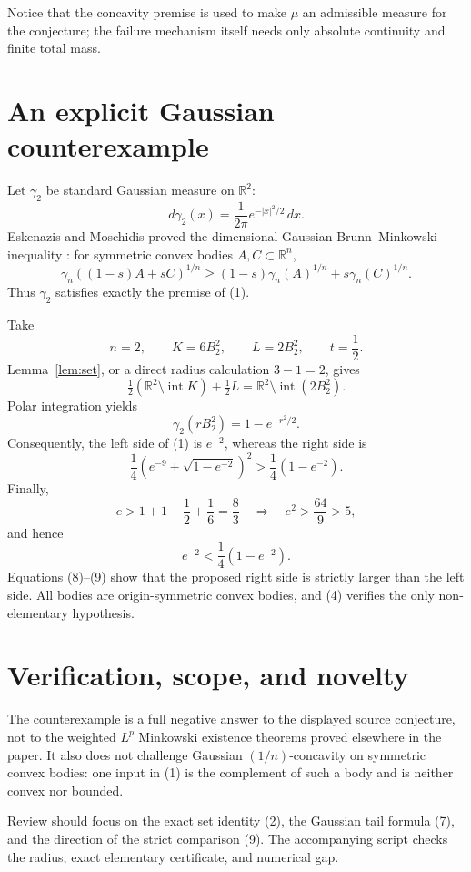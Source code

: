 \documentclass[11pt]{article}
\newcommand{\R}{\mathbb R}
\newcommand{\gauss}{\gamma}
\begin{document}
Notice that the concavity premise is used to make \(\mu\) an admissible
measure for the conjecture; the failure mechanism itself needs only
absolute continuity and finite total mass.

\section{An explicit Gaussian counterexample}

Let \(\gauss_2\) be standard Gaussian measure on \(\R^2\):
\[
 d\gauss_2(x)=\frac1{2\pi}e^{-|x|^2/2}\,dx.
\]
Eskenazis and Moschidis proved the dimensional Gaussian
Brunn--Minkowski inequality \cite{EM}: for symmetric convex bodies
\(A,C\subset\R^n\),
\[
 \gauss_n((1-s)A+sC)^{1/n}
 \ge(1-s)\gauss_n(A)^{1/n}+s\gauss_n(C)^{1/n}.
 \tag{4}
\]
Thus \(\gauss_2\) satisfies exactly the premise of (1).

Take
\[
 n=2,\qquad K=6B_2^2,\qquad L=2B_2^2,\qquad t=\frac12.
 \tag{5}
\]
Lemma~\ref{lem:set}, or a direct radius calculation \(3-1=2\), gives
\[
 \tfrac12(\R^2\setminus\operatorname{int}K)+\tfrac12L
 =\R^2\setminus\operatorname{int}(2B_2^2). \tag{6}
\]
Polar integration yields
\[
 \gauss_2(rB_2^2)=1-e^{-r^2/2}. \tag{7}
\]
Consequently, the left side of (1) is \(e^{-2}\), whereas the right side is
\[
 \frac14\left(e^{-9}+\sqrt{1-e^{-2}}\right)^2
 >\frac14(1-e^{-2}). \tag{8}
\]
Finally,
\[
 e>1+1+\frac12+\frac16=\frac83
 \quad\Longrightarrow\quad e^2>\frac{64}{9}>5,
\]
and hence
\[
 e^{-2}<\frac14(1-e^{-2}). \tag{9}
\]
Equations (8)--(9) show that the proposed right side is strictly larger than
the left side.  All bodies are origin-symmetric convex bodies, and (4)
verifies the only non-elementary hypothesis.

\section{Verification, scope, and novelty}

The counterexample is a full negative answer to the displayed source
conjecture, not to the weighted \(L^p\) Minkowski existence theorems proved
elsewhere in the paper.  It also does not challenge Gaussian
\((1/n)\)-concavity on symmetric convex bodies: one input in (1) is the
complement of such a body and is neither convex nor bounded.

Review should focus on the exact set identity (2), the Gaussian tail formula
(7), and the direction of the strict comparison (9).  The accompanying
script checks the radius, exact elementary certificate, and numerical gap.
\end{document}
